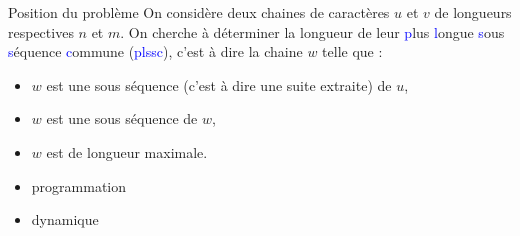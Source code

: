 \documentclass[10pt]{beamer}
\begin{document}
\begin{frame}{\Ctitle}{\stitle}
	\begin{exampleblock}{Position du problème}
		On considère deux chaines de caractères $u$ et $v$ de longueurs respectives $n$ et $m$. On cherche à déterminer la longueur de leur \textcolor{blue}{p}lus \textcolor{blue}{l}ongue \textcolor{blue}{s}ous \textcolor{blue}{s}équence \textcolor{blue}{c}ommune (\textcolor{blue}{plssc}), c'est à dire la chaine $w$ telle que :
		\begin{itemize}
			\item<2-> $w$ est une sous séquence (c'est à dire une suite extraite) de $u$,
			\item<3-> $w$ est une sous séquence de $w$,
			\item<4-> $w$ est de longueur maximale.
		\end{itemize}
		\begin{itemize}
			\item<6-> {\sc progr\textcolor{BrickRed}{a}m\textcolor{BrickRed}{m}at\textcolor{BrickRed}{i}on}
			\item<7-> {\sc dyn\textcolor{BrickRed}{ami}que}
		\end{itemize}
	\end{exampleblock}
\end{frame}
\end{document}
